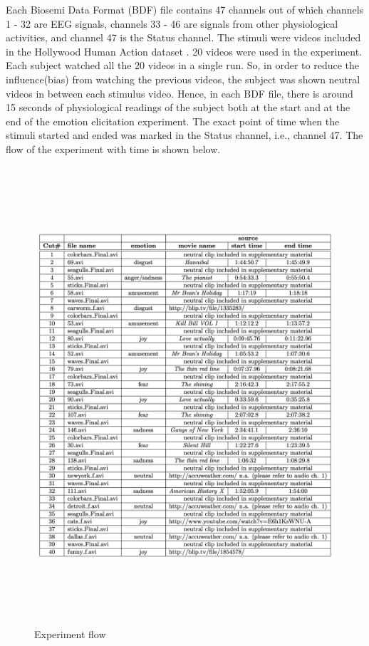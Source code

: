 Each Biosemi Data Format (BDF) file contains 47 channels out of which channels 1 - 32 are EEG signals, channels 33 - 46 are signals from other physiological activities, and channel 47 is the Status channel. The stimuli were videos included in the Hollywood Human Action dataset \cite{holly}. 20 videos were used in the experiment. Each subject watched all the 20 videos in a single run. So, in order to reduce the influence(bias) from watching the previous videos, the subject was shown neutral videos in between each stimulus video. Hence, in each BDF file, there is around 15 seconds of physiological readings of the subject both at the start and at the end of the emotion elicitation experiment. The exact point of time when the stimuli started and ended was marked in the Status channel, i.e., channel 47. The flow of the experiment with time is shown below.

\begin{figure}[H]
\centering
\includegraphics[height=17cm]{Figures/experiment_flow.png}
\caption{Experiment flow}
\label{fig22}
\end{figure}

